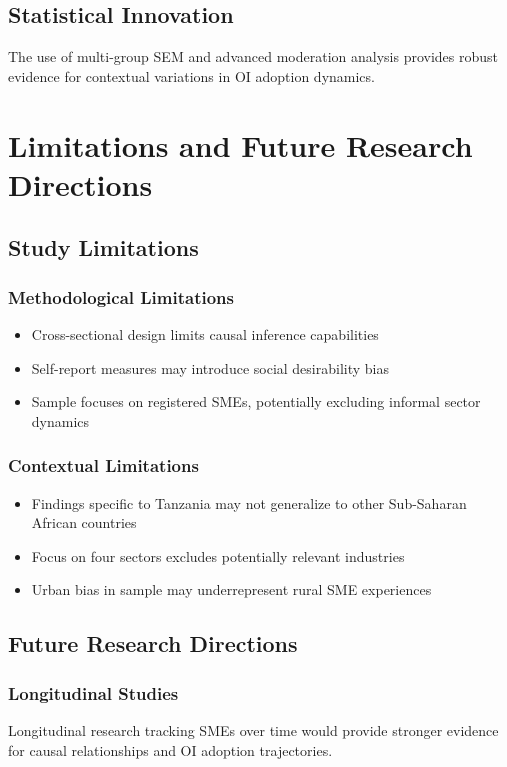 \subsection{Statistical Innovation}
The use of multi-group SEM and advanced moderation analysis provides robust evidence for contextual variations in OI adoption dynamics.

\section{Limitations and Future Research Directions}

\subsection{Study Limitations}

\subsubsection{Methodological Limitations}
\begin{itemize}
    \item Cross-sectional design limits causal inference capabilities
    \item Self-report measures may introduce social desirability bias
    \item Sample focuses on registered SMEs, potentially excluding informal sector dynamics
\end{itemize}

\subsubsection{Contextual Limitations}
\begin{itemize}
    \item Findings specific to Tanzania may not generalize to other Sub-Saharan African countries
    \item Focus on four sectors excludes potentially relevant industries
    \item Urban bias in sample may underrepresent rural SME experiences
\end{itemize}

\subsection{Future Research Directions}

\subsubsection{Longitudinal Studies}
Longitudinal research tracking SMEs over time would provide stronger evidence for causal relationships and OI adoption trajectories.

